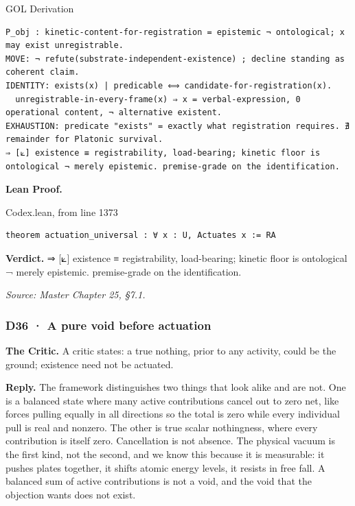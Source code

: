 \documentclass[10pt,twocolumn]{article}
\begin{document}
\begin{golbox}{GOL Derivation}
\begin{lstlisting}[style=golv]
P_obj : kinetic-content-for-registration = epistemic ¬ ontological; x may exist unregistrable.
MOVE: ¬ refute(substrate-independent-existence) ; decline standing as coherent claim.
IDENTITY: exists(x) | predicable ⟺ candidate-for-registration(x).
  unregistrable-in-every-frame(x) ⇒ x = verbal-expression, 0 operational content, ¬ alternative existent.
EXHAUSTION: predicate "exists" = exactly what registration requires. ∄ remainder for Platonic survival.
⇒ [⟀] existence ≡ registrability, load-bearing; kinetic floor is ontological ¬ merely epistemic. premise-grade on the identification.
\end{lstlisting}
\end{golbox}

\textbf{Lean Proof.}

\begin{leanexcerpt}{Codex.lean, from line 1373}
\begin{lstlisting}[style=leanx,firstnumber=1373]
theorem actuation_universal : ∀ x : U, Actuates x := RA
\end{lstlisting}
\end{leanexcerpt}

\textbf{Verdict.} ⇒ {[}⟀{]} existence ≡ registrability, load-bearing;
kinetic floor is ontological ¬ merely epistemic. premise-grade on the
identification.

\emph{Source: Master Chapter 25, §7.1.}

\hypertarget{d36-a-pure-void-before-actuation}{%
\subsubsection{D36 · A pure void before
actuation}\label{d36-a-pure-void-before-actuation}}

\textbf{The Critic.} A critic states: a true nothing, prior to any
activity, could be the ground; existence need not be actuated.

\textbf{Reply.} The framework distinguishes two things that look alike
and are not. One is a balanced state where many active contributions
cancel out to zero net, like forces pulling equally in all directions so
the total is zero while every individual pull is real and nonzero. The
other is true scalar nothingness, where every contribution is itself
zero. Cancellation is not absence. The physical vacuum is the first
kind, not the second, and we know this because it is measurable: it
pushes plates together, it shifts atomic energy levels, it resists in
free fall. A balanced sum of active contributions is not a void, and the
void that the objection wants does not exist.
\end{document}
